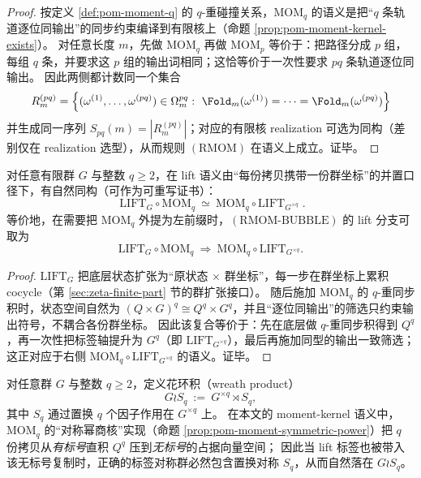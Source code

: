 \begin{proof}
按定义 \ref{def:pom-moment-q} 的 \(q\)-重碰撞关系，\(\mathrm{MOM}_q\) 的语义是把“\(q\) 条轨道逐位同输出”的同步约束编译到有限核上（命题 \ref{prop:pom-moment-kernel-exists}）。
对任意长度 \(m\)，先做 \(\mathrm{MOM}_q\) 再做 \(\mathrm{MOM}_p\) 等价于：把路径分成 \(p\) 组，每组 \(q\) 条，并要求这 \(p\) 组的输出词相同；这恰等价于一次性要求 \(pq\) 条轨道逐位同输出。
因此两侧都计数同一个集合
\[
R_m^{(pq)}=\Bigl\{(\omega^{(1)},\dots,\omega^{(pq)})\in\Omega_m^{pq}:\ \Fold_m(\omega^{(1)})=\cdots=\Fold_m(\omega^{(pq)})\Bigr\}
\]
并生成同一序列 \(S_{pq}(m)=|R_m^{(pq)}|\)；对应的有限核 realization 可选为同构（差别仅在 realization 选型），从而规则 \((\mathrm{RMOM})\) 在语义上成立。证毕。
\end{proof}

\begin{proposition}\label{prop:pom-mom-lift-beck-chevalley}
对任意有限群 \(G\) 与整数 \(q\ge 2\)，在 lift 语义由“每份拷贝携带一份群坐标”的并置口径下，有自然同构（可作为可重写证书）：
\[
\boxed{\;
\mathrm{LIFT}_G\circ \mathrm{MOM}_q\ \simeq\ \mathrm{MOM}_q\circ \mathrm{LIFT}_{G^{\times q}}\; }.
\]
等价地，在需要把 \(\mathrm{MOM}_q\) 外提为左前缀时，\((\mathrm{RMOM\text{-}BUBBLE})\) 的 lift 分支可取为
\[
\mathrm{LIFT}_G\circ \mathrm{MOM}_q\ \Rightarrow\ \mathrm{MOM}_q\circ \mathrm{LIFT}_{G^{\times q}}.
\]
\end{proposition}

\begin{proof}
\(\mathrm{LIFT}_G\) 把底层状态扩张为“原状态 \(\times\) 群坐标”，每一步在群坐标上累积 cocycle（第 \ref{sec:zeta-finite-part} 节的群扩张接口）。
随后施加 \(\mathrm{MOM}_q\) 的 \(q\)-重同步积时，状态空间自然为 \((Q\times G)^q\cong Q^q\times G^q\)，并且“逐位同输出”的筛选只约束输出符号，不耦合各份群坐标。
因此该复合等价于：先在底层做 \(q\)-重同步积得到 \(Q^q\)，再一次性把标签轴提升为 \(G^q\)（即 \(\mathrm{LIFT}_{G^{\times q}}\)），最后再施加同型的输出一致筛选；这正对应于右侧 \(\mathrm{MOM}_q\circ \mathrm{LIFT}_{G^{\times q}}\) 的语义。证毕。
\end{proof}

\begin{definition}[花环积与无标号复制]\label{def:pom-wreath-product}
对任意群 \(G\) 与整数 \(q\ge 2\)，定义花环积（wreath product）
\[
G\wr S_q\ :=\ G^{\times q}\rtimes S_q,
\]
其中 \(S_q\) 通过置换 \(q\) 个因子作用在 \(G^{\times q}\) 上。
在本文的 moment-kernel 语义中，\(\mathrm{MOM}_q\) 的“对称幂商核”实现（命题 \ref{prop:pom-moment-symmetric-power}）把 \(q\) 份拷贝从\emph{有标号}直积 \(Q^q\) 压到\emph{无标号}的占据向量空间；
因此当 lift 标签也被带入该无标号复制时，正确的标签对称群必然包含置换对称 \(S_q\)，从而自然落在 \(G\wr S_q\)。
\end{definition}

